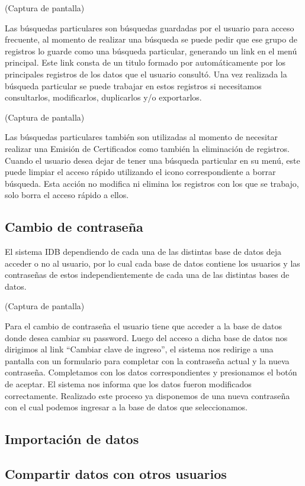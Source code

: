 \documentclass[a4paper,10pt]{article}
\begin{document}
(Captura de pantalla)

Las búsquedas particulares son búsquedas guardadas por el usuario para acceso frecuente, al momento de realizar una búsqueda se puede pedir que ese grupo de registros lo guarde como una búsqueda particular, generando un link en el menú principal. Este link consta de un titulo formado por automáticamente por los principales registros  de los  datos que el usuario consultó. Una vez realizada la búsqueda particular se puede trabajar en estos registros si necesitamos consultarlos,  modificarlos, duplicarlos y/o exportarlos.

(Captura de pantalla)

Las búsquedas particulares también son utilizadas al momento de necesitar realizar una Emisión de Certificados como también la eliminación de registros. 
Cuando el usuario desea dejar de tener una búsqueda particular en su menú, este puede limpiar el  acceso rápido utilizando el icono correspondiente a borrar búsqueda. Esta acción no modifica ni elimina los registros con los que se trabajo, solo borra el acceso rápido a ellos.
    
\subsection{Cambio de contraseña}

El sistema IDB dependiendo de cada una de las distintas base de datos deja acceder o no al usuario, por lo cual cada base de datos contiene los usuarios y las contraseñas de estos independientemente de cada una de las distintas bases de datos.

(Captura de pantalla)

Para el cambio de contraseña el usuario tiene que acceder a la base de datos donde desea cambiar su password. Luego del acceso a dicha base de datos nos dirigimos al link “Cambiar clave de ingreso”, el sistema nos redirige a una pantalla con un formulario para completar con la contraseña actual y la nueva contraseña. Completamos  con los datos correspondientes y presionamos el botón de aceptar. 
El sistema nos informa que los datos fueron modificados correctamente. Realizado este proceso ya disponemos de una nueva contraseña con el cual podemos ingresar a la base de datos que seleccionamos.

\subsection{Importación de datos}
\subsection{Compartir datos con otros usuarios}
\end{document}
